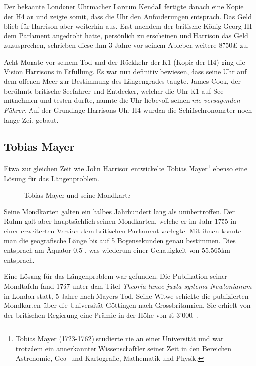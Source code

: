 \begin{refsection}
Der bekannte Londoner Uhrmacher Larcum Kendall fertigte danach eine Kopie der H4 an und zeigte somit, dass die Uhr den Anforderungen entsprach.
Das Geld blieb für Harrison aber weiterhin aus. Erst nachdem der britische König Georg III dem Parlament angedroht hatte, persönlich zu erscheinen und Harrison das Geld zuzusprechen, schrieben diese ihm 3 Jahre vor seinem Ableben weitere 8750£ zu.

Acht Monate vor seinem Tod und der Rückkehr der K1 (Kopie der H4) ging die Vision Harrisons in Erfüllung. Es war nun definitiv bewiesen, dass seine Uhr auf dem offenen Meer zur Bestimmung des Längengrades taugte. James Cook, der berühmte britische Seefahrer und Entdecker, welcher die Uhr K1 auf See mitnehmen und testen durfte, nannte die Uhr liebevoll seinen \textit{nie versagenden Führer}.
Auf der Grundlage Harrisons Uhr H4 wurden die Schiffschronometer noch lange Zeit gebaut.



\subsection{Tobias Mayer}
Etwa zur gleichen Zeit wie John Harrison entwickelte Tobias Mayer\footnote{%
Tobias Mayer (1723-1762) studierte nie an einer Universität und war trotzdem ein annerkannter Wissenschaftler seiner Zeit in den Bereichen Astronomie, Geo- und Kartografie, Mathematik und Physik.}
ebenso eine Lösung für das Längenproblem.

\begin{figure}[!htb]
\centering
\quad \quad
\centering
\caption{Tobias Mayer und seine Mondkarte} 
\end{figure}

Seine Mondkarten galten ein halbes Jahrhundert lang als unübertroffen. Der Ruhm galt aber hauptsächlich seinen Mondkarten, welche er im Jahr 1755 in einer erweiterten Version dem britischen Parlament vorlegte.
Mit ihnen konnte man die geografische Länge bis auf 5 Bogensekunden genau bestimmen. Dies entsprach am Äquator $0.5 ^{\circ}$, was wiederum einer Genauigkeit von 55.565km entsprach.

Eine Lösung für das Längenproblem war gefunden. Die Publikation seiner Mondtafeln fand 1767 unter dem Titel \textit{Theoria lunae juxta systema Newtonianum} in London statt, 5 Jahre nach Mayers Tod. 
Seine Witwe schickte die publizierten Mondkarten über die Universität Göttingen nach Grossbritannien. Sie erhielt von der britischen Regierung eine Prämie in der Höhe von £ 3’000.-.


\end{refsection}
